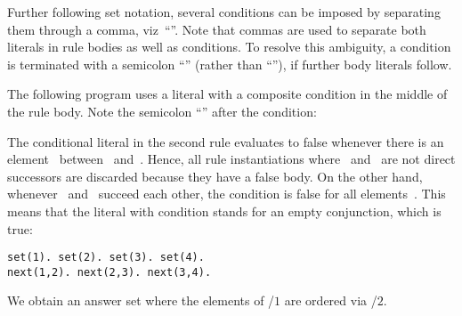 Further following set notation,
several conditions can be imposed by separating them through a comma, viz~``\code{,}''.
Note that commas are used to separate both literals in rule bodies as well as conditions.
To resolve this ambiguity, 
a condition is terminated with a semicolon ``\code{;}'' (rather than ``\code{,}''), if further body literals follow.

\begin{example}\label{ex:sort}
The following program uses a literal with a composite condition in the middle of the rule body. 
Note the semicolon ``\code{;}'' after the condition:
%

%
The conditional literal in the second rule evaluates to false
whenever there is an element~ between~ and~.
Hence, all rule instantiations where~ and~ are not direct successors are discarded
because they have a false body.
On the other hand, whenever~ and~ succeed each other,
the condition is false for all elements~.
This means that the literal with condition stands for an empty conjunction, which is true:%
%
\begin{lstlisting}[numbers=none]
set(1). set(2). set(3). set(4).
next(1,2). next(2,3). next(3,4).
\end{lstlisting}
We obtain an answer set where the elements of /$1$ are ordered via /$2$.
\eexample
\end{example}

